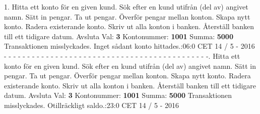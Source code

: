 1.   Hitta ett konto för en given kund.   Sök efter en kund utifrån (del av) angivet namn.   Sätt in pengar.   Ta ut pengar.   Överför pengar mellan konton.   Skapa nytt konto.   Radera existerande konto.   Skriv ut alla konton i banken.   Återställ banken till ett tidigare datum. Avsluta\newline
Val: \textbf{3}\newline
Kontonummer: \textbf{1001}\newline
Summa: \textbf{5000}\newline
Transaktionen misslyckades. Inget sådant konto hittades.:06:0 CET 14 / 5 - 2016\newline
\newline
- - - - - - - - - - - - - - - - - - - - - - - - - - - - - - - - - - - - - - - - - - - -.   Hitta ett konto för en given kund.   Sök efter en kund utifrån (del av) angivet namn.   Sätt in pengar.   Ta ut pengar.   Överför pengar mellan konton.   Skapa nytt konto.   Radera existerande konto.   Skriv ut alla konton i banken.   Återställ banken till ett tidigare datum. Avsluta\newline
Val: \textbf{3}\newline
Kontonummer: \textbf{1001}\newline
Summa: \textbf{5000}\newline
Transaktionen misslyckades.  Otillräckligt saldo.:23:0 CET 14 / 5 - 2016\newline
\newline
